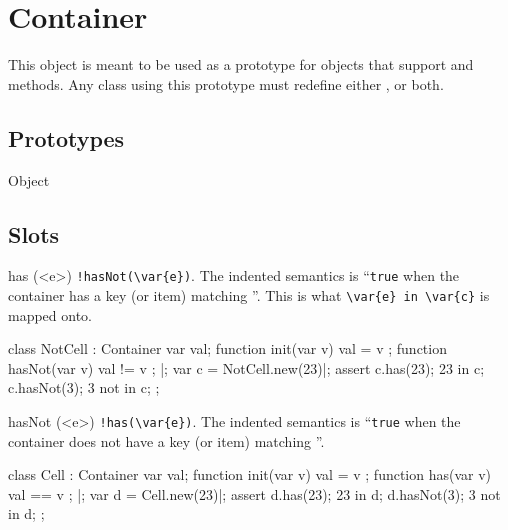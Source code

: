 
\section{Container}

This object is meant to be used as a prototype for objects that support
 and  methods.  Any class using this prototype
must redefine either ,  or both.

\subsection{Prototypes}
\begin{refObjects}
\item[Object]
\end{refObjects}

\subsection{Slots}

\begin{urbiscriptapi}
\item[has](<e>)%
  \lstinline|!hasNot(\var{e})|.  The indented semantics is
  ``\lstinline|true| when the container has a key (or item) matching
  ''.  This is what \lstinline|\var{e} in \var{c}| is mapped onto.

\begin{urbiscript}
class NotCell : Container
{
  var val;
  function init(var v)   { val = v };
  function hasNot(var v) { val != v };
}|;
var c = NotCell.new(23)|;
assert
{
  c.has(23);     23 in c;
  c.hasNot(3);    3 not in c;
};
\end{urbiscript}


\item[hasNot](<e>)%
  \lstinline|!has(\var{e})|.  The indented semantics is ``\lstinline|true|
  when the container does not have a key (or item) matching ''.

\begin{urbiscript}
class Cell : Container
{
  var val;
  function init(var v) { val = v };
  function has(var v)  { val == v };
}|;
var d = Cell.new(23)|;
assert
{
  d.has(23);     23 in d;
  d.hasNot(3);    3 not in d;
};
\end{urbiscript}
\end{urbiscriptapi}

